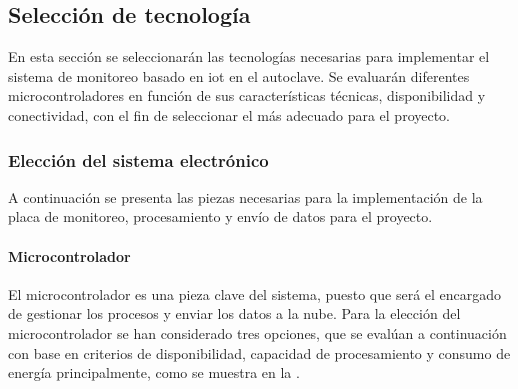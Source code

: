 \subsection{Selección de tecnología}
En esta sección se seleccionarán las tecnologías necesarias para implementar el sistema de monitoreo basado en \acrshort{iot} en el autoclave. Se evaluarán diferentes microcontroladores en función de sus características técnicas, disponibilidad y conectividad, con el fin de seleccionar el más adecuado para el proyecto.
\subsubsection{Elección del sistema electrónico}
A continuación se presenta las piezas necesarias para la implementación de la placa de monitoreo, procesamiento y envío de datos para el proyecto.
\paragraph{Microcontrolador}
El microcontrolador es una pieza clave del sistema, puesto que será el encargado de gestionar los procesos y enviar los datos a la nube. Para la elección del microcontrolador se han considerado tres opciones, que se evalúan a continuación con base en criterios de disponibilidad, capacidad de procesamiento y consumo de energía principalmente, como se muestra en la .

